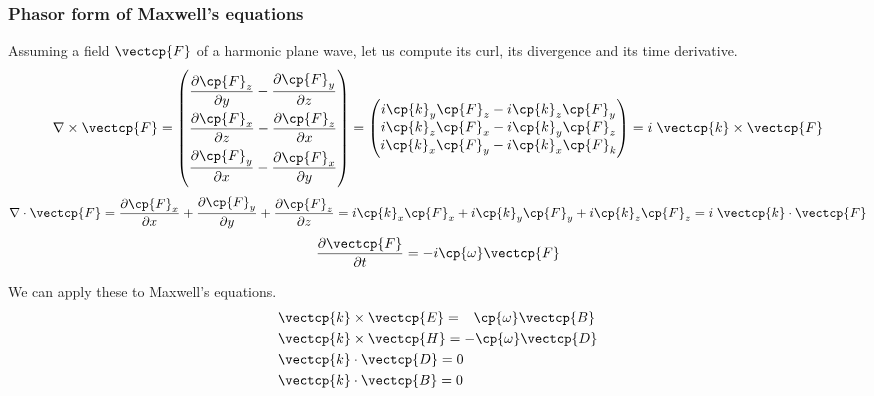 \begin{refsection}
\subsubsection{Phasor form of Maxwell's equations}
Assuming a field $\vectcp{F}$ of a harmonic plane wave, let us compute its curl, its divergence and its time derivative.
\begin{equation}
    \setlength{\delimitershortfall}{0pt}
    \nabla \times \vectcp{F}
    =
    \begin{pmatrix}
        \dfrac{\partial \cp{F}_z}{\partial y} -
        \dfrac{\partial \cp{F}_y}{\partial z}
        \\[2ex]
        \dfrac{\partial \cp{F}_x}{\partial z} -
        \dfrac{\partial \cp{F}_z}{\partial x}
        \\[2ex]
        \dfrac{\partial \cp{F}_y}{\partial x} -
        \dfrac{\partial \cp{F}_x}{\partial y}
    \end{pmatrix}
    =
    \begin{pmatrix}
        i \cp{k}_y \cp{F}_z - i \cp{k}_z \cp{F}_y \\
        i \cp{k}_z \cp{F}_x - i \cp{k}_y \cp{F}_z \\
        i \cp{k}_x \cp{F}_y - i \cp{k}_x \cp{F}_k
    \end{pmatrix}
    =
    i \; \vectcp{k} \times \vectcp{F}
\end{equation}
\begin{equation}
    \nabla \cdot \vectcp{F}
    =
    \frac{\partial \cp{F}_x}{\partial x} +
    \frac{\partial \cp{F}_y}{\partial y} +
    \frac{\partial \cp{F}_z}{\partial z}
    =
    i \cp{k}_x \cp{F}_x + i \cp{k}_y \cp{F}_y + i \cp{k}_z \cp{F}_z
    =
    i \; \vectcp{k} \cdot \vectcp{F}
\end{equation}
\begin{equation}
    \frac{\partial \vectcp{F}}{\partial t}
    =
    -i \cp{\omega} \vectcp{F}
\end{equation}

We can apply these to Maxwell's equations.
\begin{subequations}
    \begin{align}
        &\vectcp{k} \times \vectcp{E} = \hphantom{\mathrel{-}}\cp{\omega} \vectcp{B} \\
        &\vectcp{k} \times \vectcp{H} = -\cp{\omega} \vectcp{D} \\
        &\vectcp{k} \cdot  \vectcp{D} = 0 \\
        &\vectcp{k} \cdot  \vectcp{B} = 0
    \end{align}
\end{subequations}


\end{refsection}
